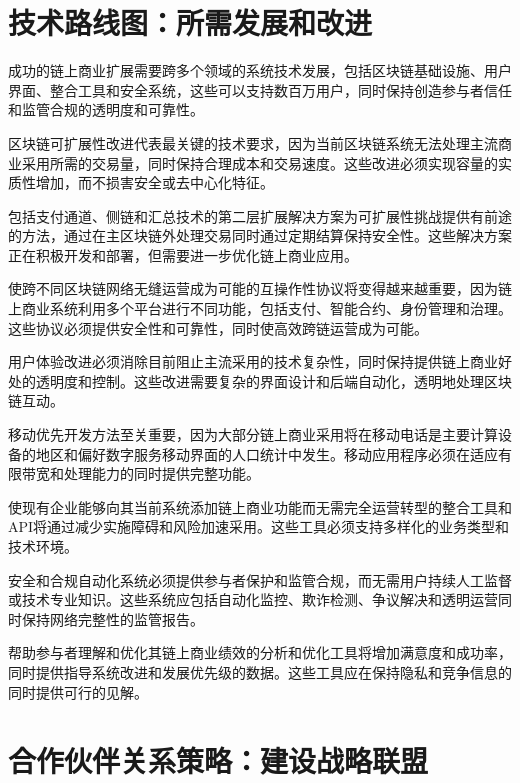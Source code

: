 \documentclass[
  Letterpaper,
]{scrbook}
\begin{document}
\section{技术路线图：所需发展和改进}\label{ux6280ux672fux8defux7ebfux56feux6240ux9700ux53d1ux5c55ux548cux6539ux8fdb}

成功的链上商业扩展需要跨多个领域的系统技术发展，包括区块链基础设施、用户界面、整合工具和安全系统，这些可以支持数百万用户，同时保持创造参与者信任和监管合规的透明度和可靠性。

区块链可扩展性改进代表最关键的技术要求，因为当前区块链系统无法处理主流商业采用所需的交易量，同时保持合理成本和交易速度。这些改进必须实现容量的实质性增加，而不损害安全或去中心化特征。

包括支付通道、侧链和汇总技术的第二层扩展解决方案为可扩展性挑战提供有前途的方法，通过在主区块链外处理交易同时通过定期结算保持安全性。这些解决方案正在积极开发和部署，但需要进一步优化链上商业应用。

使跨不同区块链网络无缝运营成为可能的互操作性协议将变得越来越重要，因为链上商业系统利用多个平台进行不同功能，包括支付、智能合约、身份管理和治理。这些协议必须提供安全性和可靠性，同时使高效跨链运营成为可能。

用户体验改进必须消除目前阻止主流采用的技术复杂性，同时保持提供链上商业好处的透明度和控制。这些改进需要复杂的界面设计和后端自动化，透明地处理区块链互动。

移动优先开发方法至关重要，因为大部分链上商业采用将在移动电话是主要计算设备的地区和偏好数字服务移动界面的人口统计中发生。移动应用程序必须在适应有限带宽和处理能力的同时提供完整功能。

使现有企业能够向其当前系统添加链上商业功能而无需完全运营转型的整合工具和API将通过减少实施障碍和风险加速采用。这些工具必须支持多样化的业务类型和技术环境。

安全和合规自动化系统必须提供参与者保护和监管合规，而无需用户持续人工监督或技术专业知识。这些系统应包括自动化监控、欺诈检测、争议解决和透明运营同时保持网络完整性的监管报告。

帮助参与者理解和优化其链上商业绩效的分析和优化工具将增加满意度和成功率，同时提供指导系统改进和发展优先级的数据。这些工具应在保持隐私和竞争信息的同时提供可行的见解。

\section{合作伙伴关系策略：建设战略联盟}\label{ux5408ux4f5cux4f19ux4f34ux5173ux7cfbux7b56ux7565ux5efaux8bbeux6218ux7565ux8054ux76df}
\end{document}
